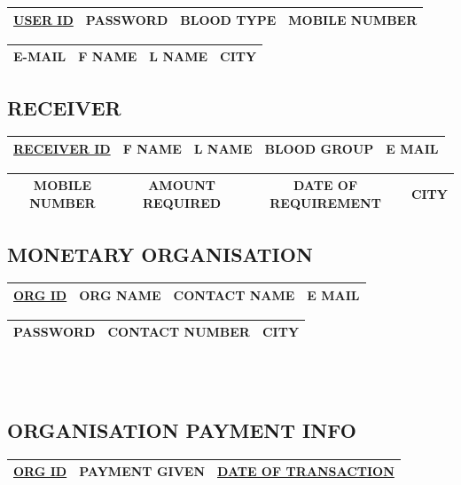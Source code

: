 \begin{sloppypar}
\begin{tabular}{ | c | c | c | c | }
 \hline
 \underline{USER ID} & PASSWORD & BLOOD TYPE & MOBILE NUMBER \\
 \hline
\end{tabular}
\begin{tabular}{ | c | c | c | c | }
 \hline
 E-MAIL & F NAME & L NAME & CITY \\
 \hline
\end{tabular}

\subsection{RECEIVER}

\begin{tabular}{ | c | c | c | c | c | }
 \hline
 \underline{RECEIVER ID} & F NAME & L NAME & BLOOD GROUP & E MAIL \\
 \hline
\end{tabular}
\begin{tabular}{ | c | c | c | c | }
 \hline
 MOBILE NUMBER & AMOUNT REQUIRED & DATE OF REQUIREMENT & CITY \\
 \hline
\end{tabular}

\subsection{MONETARY ORGANISATION}

\begin{tabular}{ | c | c | c | c | }
 \hline
 \underline{ORG ID} & ORG NAME & CONTACT NAME & E MAIL \\
 \hline
\end{tabular}
\begin{tabular}{ | c | c | c | }
 \hline
 PASSWORD & CONTACT NUMBER & CITY \\
 \hline
\end{tabular} \\ \\

\subsection{ORGANISATION PAYMENT INFO}

\begin{tabular}{ | c | c | c | }
 \hline
 \underline{ORG ID} & PAYMENT GIVEN & \underline{DATE OF TRANSACTION} \\
 \hline
\end{tabular}


\end{sloppypar}
